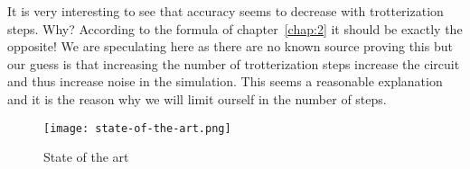 It is very interesting to see that accuracy seems to decrease with trotterization steps. Why? According to the formula of chapter~\ref{chap:2} it should be exactly the opposite! We are speculating here as there are no known source proving this but our guess is that increasing the number of trotterization steps increase the circuit and thus increase noise in the simulation. This seems a reasonable explanation and it is the reason why we will limit ourself in the number of steps.
\begin{figure}[htb]
\texttt{[image: state-of-the-art.png]}
\centering
\caption{State of the art}
\label{fig:state-of-the-art}
\end{figure}


